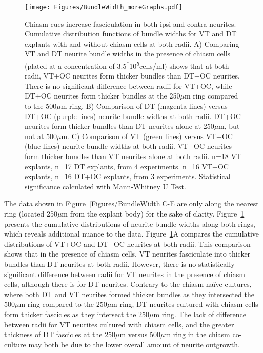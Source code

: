 \begin{figure}[hbtp]
    \begin{center}
        \texttt{[image: Figures/BundleWidth\_moreGraphs.pdf]}
        \caption[Chiasm cues increase fasciculation in both ipsi and contra neurites.]
        {Chiasm cues increase fasciculation in both ipsi and contra neurites.
		Cumulative distribution functions of bundle widths for VT and DT explants with and without chiasm cells at both radii.
		A) Comparing VT and DT neurite bundle widths in the presence of chiasm cells (plated at a concentration of 3.5\textsuperscript{*}10\textsuperscript{5}cells/ml) shows that at both radii, VT+OC neurites form thicker bundles than DT+OC neurites.
		There is no significant difference between radii for VT+OC, while DT+OC neurites form thicker bundles at the 250$\mu$m ring compared to the 500$\mu$m ring.
		B) Comparison of DT (magenta lines) versus DT+OC (purple lines) neurite bundle widths at both radii.
		DT+OC neurites form thicker bundles than DT neurites alone at 250$\mu$m, but not at 500$\mu$m.
		C) Comparison of VT (green lines) versus VT+OC (blue lines) neurite bundle widths at both radii.
		VT+OC neurites form thicker bundles than VT neurites alone at both radii.
		n=18 VT explants, n=17 DT explants, from 4 experiments.
		n=16 VT+OC explants, n=16 DT+OC explants, from 3 experiments.
		Statistical significance calculated with Mann-Whitney U Test.
		}
        \label{Figures/BundleWidth_moreGraphs}
    \end{center}
\end{figure}
The data shown in Figure~\ref{Figures/BundleWidth}C-E are only along the nearest ring (located 250$\mu$m from the explant body) for the sake of clarity.
Figure~\ref{Figures/BundleWidth_moreGraphs} presents the cumulative distributions of neurite bundle widths along both rings, which reveals additional nuance to the data.
Figure~\ref{Figures/BundleWidth_moreGraphs}A compares the cumulative distributions of VT+OC and DT+OC neurites at both radii.
This comparison shows that in the presence of chiasm cells, VT neurites fasciculate into thicker bundles than DT neurites at both radii.
However, there is no statistically significant difference between radii for VT neurites in the presence of chiasm cells, although there is for DT neurites.
Contrary to the chiasm-na\"ive cultures, where both DT and VT neurites formed thicker bundles as they intersected the 500$\mu$m ring compared to the 250$\mu$m ring, DT neurites cultured with chiasm cells form thicker fascicles as they intersect the 250$\mu$m ring.
The lack of difference between radii for VT neurites cultured with chiasm cells, and the greater thickness of DT fascicles at the 250$\mu$m versus 500$\mu$m ring in the chiasm co-culture may both be due to the lower overall amount of neurite outgrowth.
